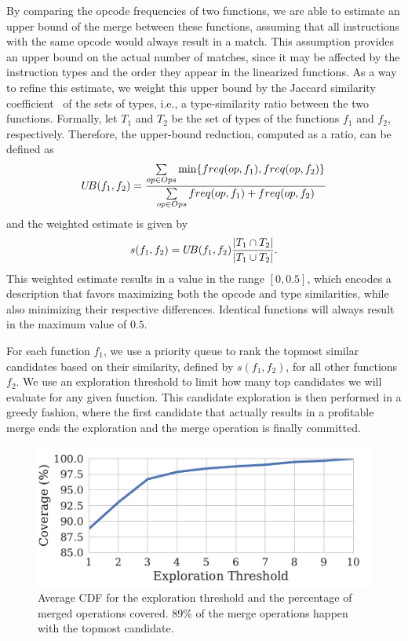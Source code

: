 By comparing the opcode frequencies of two functions, we are able to estimate
an upper bound of the merge between these functions, assuming that all
instructions with the same opcode would always result in a match.
This assumption provides an upper bound on the actual number of matches, since
it may be affected by the instruction types and the order they appear in the
linearized functions.
As a way to refine this estimate, we weight this upper bound by the Jaccard
similarity coefficient~\cite{jaccard} of the sets of types, i.e., a
type-similarity ratio between the two functions.
Formally, let $T_1$ and $T_2$ be the set of types of the functions $f_1$ and
$f_2$, respectively.
Therefore, the upper-bound reduction, computed as a ratio, can be defined as
\vspace{-1.5ex}\[
   U\!B(f_1,f_2) = \frac{\sum\limits_{op \in Ops} \min\{freq(op,f_1),freq(op,f_2)\}}{\sum\limits_{op \in Ops} freq(op,f_1)+freq(op,f_2)}
\vspace{-1.5ex}
\]
and the weighted estimate is given by
\vspace{-1.5ex}\[
     s(f_1,f_2) = U\!B(f_1,f_2) \frac{|T_1 \cap T_2|}{|T_1 \cup T_2|}.
\vspace{-1.5ex}
\]
This weighted estimate results in a value in the range $[0,0.5]$,
which encodes a description that favors maximizing both the opcode and type
similarities, while also minimizing their respective differences.
Identical functions will always result in the maximum value of $0.5$.

For each function $f_1$, we use a priority queue to rank the topmost
similar candidates based on their similarity, defined by $s(f_1,f_2)$, for all
other functions $f_2$.
We use an exploration threshold to limit how many top candidates we will
evaluate for any given function.
This candidate exploration is then performed in a greedy fashion, where the first
candidate that actually results in a profitable merge ends the exploration and
the merge operation is finally committed.

\begin{figure}[t!]
  \centering
  \includegraphics[width=0.8\linewidth]{figs/average-cdf-exploration-threshold.pdf}
  \caption{Average CDF for the exploration threshold and the percentage of merged operations covered.
           89\% of the merge operations happen with the topmost candidate.}
  \label{fig:average-cdf-exploration-threshold}
\end{figure}


